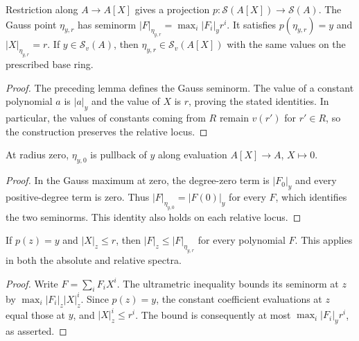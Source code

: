\begin{definition}\label{spectrum:gauss-point}
\leanok
{}
Restriction along $A\to A[X]$ gives a projection $p:\mathcal S(A[X])\to\mathcal S(A)$.
The Gauss point $\eta_{y,r}$ has seminorm $|F|_{\eta_{y,r}}=\max_i|F_i|_y r^i$.
It satisfies $p(\eta_{y,r})=y$ and $|X|_{\eta_{y,r}}=r$.
If $y\in\mathcal S_v(A)$, then $\eta_{y,r}\in\mathcal S_v(A[X])$ with the same values
on the prescribed base ring.
\end{definition}
\begin{proof}
The preceding lemma defines the Gauss seminorm. The value of a constant polynomial
$a$ is $|a|_y$ and the value of $X$ is $r$, proving the stated identities.
In particular, the values of constants coming from $R$ remain $v(r')$ for $r'\in R$,
so the construction preserves the relative locus.
\end{proof}

\begin{lemma}\label{spectrum:gauss-zero-radius}
\leanok
{}
At radius zero, $\eta_{y,0}$ is pullback of $y$ along evaluation $A[X]\to A$, $X\mapsto0$.
\end{lemma}
\begin{proof}
In the Gauss maximum at zero, the degree-zero term is $|F_0|_y$ and every
positive-degree term is zero. Thus $|F|_{\eta_{y,0}}=|F(0)|_y$ for every $F$,
which identifies the two seminorms. This identity also holds on each relative locus.
\end{proof}

\begin{lemma}\label{spectrum:gauss-maximality}
\leanok
{}
If $p(z)=y$ and $|X|_z\le r$, then $|F|_z\le|F|_{\eta_{y,r}}$ for every polynomial $F$.
This applies in both the absolute and relative spectra.
\end{lemma}
\begin{proof}
Write $F=\sum_iF_iX^i$. The ultrametric inequality bounds its seminorm at $z$
by $\max_i|F_i|_z|X|_z^i$. Since $p(z)=y$, the constant coefficient evaluations
at $z$ equal those at $y$, and $|X|_z^i\le r^i$.
The bound is consequently at most $\max_i|F_i|_y r^i$, as asserted.
\end{proof}

